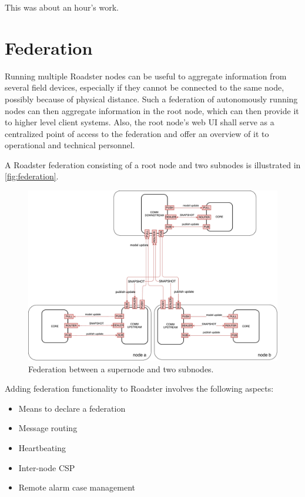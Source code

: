 This was about an hour's work.


\clearpage
\section{Federation}\label{sec:approach:federation}
Running multiple Roadster nodes can be useful to aggregate information from
several field devices, especially if they cannot be connected to the same node,
possibly because of physical distance. Such a federation of autonomously
running nodes can then aggregate information in the root node, which can then
provide it to higher level client systems. Also, the root node's web UI shall
serve as a centralized point of access to the federation and offer an overview
of it to operational and technical personnel.

A Roadster federation consisting of a root node and two subnodes is illustrated
in \autoref{fig:federation}.
\begin{figure}[]
	\includegraphics[width=\textwidth]{img/federation_protocol.pdf}
	\caption{Federation between a supernode and two subnodes.}
	\label{fig:federation}
\end{figure}

Adding federation functionality to Roadster involves the following aspects:
\begin{itemize}
	\item Means to declare a federation
	\item Message routing
	\item Heartbeating
	\item Inter-node CSP
	\item Remote alarm case management
\end{itemize}

